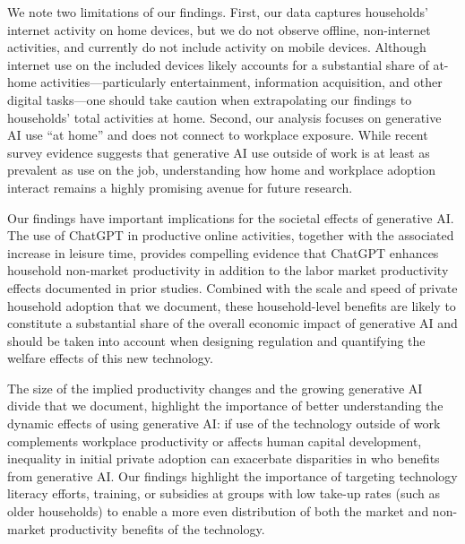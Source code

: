 \documentclass[12pt]{article}
\begin{document}

We note two limitations of our findings. First, our data captures households’ internet activity on home devices, but we do not observe offline, non-internet activities, and currently do not include activity on mobile devices. Although internet use on the included devices likely accounts for a substantial share of at-home activities—particularly entertainment, information acquisition, and other digital tasks—one should take caution when extrapolating our findings to households' total activities at home. Second, our analysis focuses on generative AI use ``at home'' and does not connect to workplace exposure. While recent survey evidence suggests that generative AI use outside of work is at least as prevalent as use on the job, understanding how home and workplace adoption interact remains a highly promising avenue for future research.

Our findings have important implications for the societal effects of generative AI. The use of ChatGPT in productive online activities, together with the associated increase in leisure time, provides compelling evidence that ChatGPT enhances household non-market productivity in addition to the labor market productivity effects documented in prior studies. Combined with the scale and speed of private household adoption that we document, these household-level benefits are likely to constitute a substantial share of the overall economic impact of generative AI and should be taken into account when designing regulation and quantifying the welfare effects of this new technology.


The size of the implied productivity changes and the growing generative AI divide that we document, highlight the importance of better understanding the dynamic effects of using generative AI: if use of the technology outside of work complements workplace productivity or affects human capital development, inequality in initial private adoption can exacerbate disparities in who benefits from generative AI. Our findings highlight the importance of targeting technology literacy efforts, training, or subsidies at groups with low take-up rates (such as older households) to enable a more even distribution of both the market and non-market productivity benefits of the technology.
\end{document}
